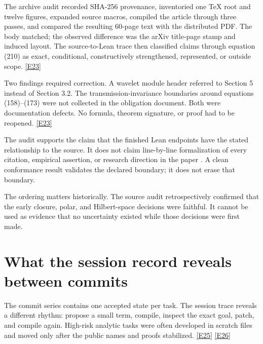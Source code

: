 \documentclass[11pt,a4paper]{article}
\newcommand{\ev}[1]{%
  \hyperref[ev:#1]{\textcolor{ReportBlue}{\textsf{\scriptsize[#1]}}}}
\begin{document}
The archive audit recorded SHA-256 provenance, inventoried one TeX root and twelve
figures, expanded source macros, compiled the article through three passes, and
compared the resulting 60-page text with the distributed PDF. The body matched; the
observed difference was the arXiv title-page stamp and induced layout. The
source-to-Lean trace then classified claims through equation (210) as exact,
conditional, constructively strengthened, represented, or outside scope. \ev{E23}

Two findings required correction. A wavelet module header referred to Section 5
instead of Section 3.2. The transmission-invariance boundaries around equations
(158)--(173) were not collected in the obligation document. Both were documentation
defects. No formula, theorem signature, or proof had to be reopened. \ev{E23}

\begin{keyresult}
The audit supports the claim that the finished Lean endpoints have the stated
relationship to the source. It does not claim line-by-line formalization of every
citation, empirical assertion, or research direction in the paper
\cite{nilsson2026}. A clean conformance result validates the declared boundary; it
does not erase that boundary.
\end{keyresult}

The ordering matters historically. The source audit retrospectively confirmed that
the early closure, polar, and Hilbert-space decisions were faithful. It cannot be
used as evidence that no uncertainty existed while those decisions were first made.

\section{What the session record reveals between commits}
\label{sec:between-commits}

The commit series contains one accepted state per task. The session trace reveals a
different rhythm: propose a small term, compile, inspect the exact goal, patch, and
compile again. High-risk analytic tasks were often developed in scratch files and
moved only after the public names and proofs stabilized. \ev{E25}\ev{E26}
\end{document}
